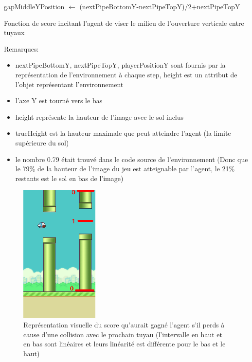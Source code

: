 \documentclass[a4paper,10pt,openany,oneside]{report}
\begin{document}
\begin{algorithm}[H]
  gapMiddleYPosition $\leftarrow$ (nextPipeBottomY-nextPipeTopY)/2+nextPipeTopY\;
  
  \caption{Fonction de score incitant l'agent de viser le milieu de l'ouverture verticale entre tuyaux}
 \end{algorithm}
 \newpage
Remarques:
\begin{itemize}
\item nextPipeBottomY, nextPipeTopY, playerPositionY sont fournis par la représentation de l'environnement à chaque step, height est un attribut de l'objet représentant l'environnement
\item l'axe Y est tourné vers le bas
\item height représente la hauteur de l'image avec le sol inclus
\item trueHeight est la hauteur maximale que peut atteindre l'agent (la limite supérieure du sol)
\item le nombre 0.79 était trouvé dans le code source de l'environnement (Donc que le 79\% de la hauteur de l'image du jeu est atteignable par l'agent, le 21\% restants est le sol en bas de l'image)
\end{itemize}
\begin{figure}[H]
	\centering
	\includegraphics[width=0.35\textwidth]{img/flappyBirdScore.png}
	\caption{Représentation visuelle du score qu'aurait gagné l'agent s'il perds à cause d'une collision avec le prochain tuyau (l'intervalle en haut et en bas sont linéaires et leurs linéarité est différente pour le bas et le haut)}
\end{figure}
\newpage
\end{document}

